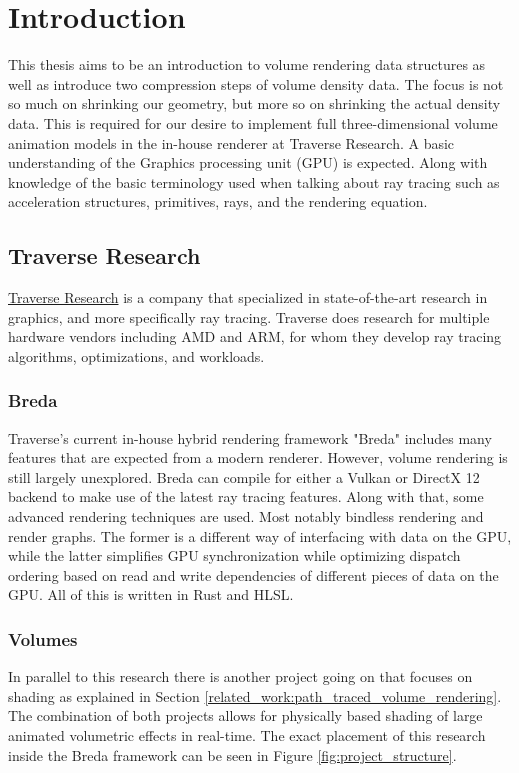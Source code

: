 \section{Introduction} \label{introduction}
This thesis aims to be an introduction to volume rendering data structures as well as introduce two compression steps of volume density data. The focus is not so much on shrinking our geometry, but more so on shrinking the actual density data. This is required for our desire to implement full three-dimensional volume animation models in the in-house renderer at Traverse Research. A basic understanding of the Graphics processing unit (GPU) is expected. Along with knowledge of the basic terminology used when talking about ray tracing such as acceleration structures, primitives, rays, and the rendering equation.


\subsection{Traverse Research} \label{introduction:traverse_research}
\href{https://traverseresearch.nl/}{Traverse Research} is a company that specialized in state-of-the-art research in graphics, and more specifically ray tracing. Traverse does research for multiple hardware vendors including AMD and ARM, for whom they develop ray tracing algorithms, optimizations, and workloads.
\subsubsection{Breda} \label{introduction:traverse_research:breda}
Traverse's current in-house hybrid rendering framework "Breda" includes many features that are expected from a modern renderer. However, volume rendering is still largely unexplored. Breda can compile for either a Vulkan or DirectX 12 backend to make use of the latest ray tracing features. Along with that, some advanced rendering techniques are used. Most notably bindless rendering\cite{BindlessRenderingSetup} and render graphs\cite{RenderGraph101}. The former is a different way of interfacing with data on the GPU, while the latter simplifies GPU synchronization while optimizing dispatch ordering based on read and write dependencies of different pieces of data on the GPU. All of this is written in Rust and HLSL.
\subsubsection{Volumes} \label{introduction:traverse_research:volumes}
In parallel to this research there is another project going on that focuses on shading as explained in Section \ref{related_work:path_traced_volume_rendering}. The combination of both projects allows for physically based shading of large animated volumetric effects in real-time. The exact placement of this research inside the Breda framework can be seen in Figure \ref{fig:project_structure}.

